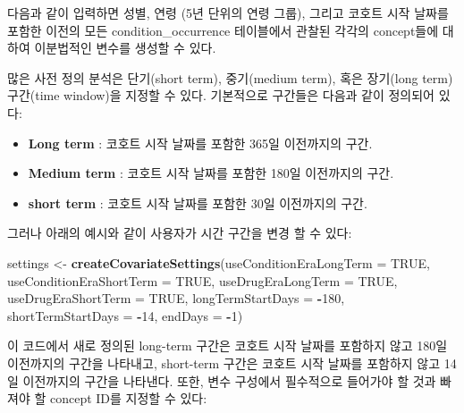 \documentclass[11pt]{book}
\newenvironment{Shaded}{\begin{snugshade}}{\end{snugshade}}
\newcommand{\KeywordTok}[1]{\textcolor[rgb]{0.13,0.29,0.53}{\textbf{#1}}}
\newcommand{\DataTypeTok}[1]{\textcolor[rgb]{0.13,0.29,0.53}{#1}}
\newcommand{\DecValTok}[1]{\textcolor[rgb]{0.00,0.00,0.81}{#1}}
\newcommand{\StringTok}[1]{\textcolor[rgb]{0.31,0.60,0.02}{#1}}
\newcommand{\OtherTok}[1]{\textcolor[rgb]{0.56,0.35,0.01}{#1}}
\newcommand{\OperatorTok}[1]{\textcolor[rgb]{0.81,0.36,0.00}{\textbf{#1}}}
\newcommand{\NormalTok}[1]{#1}
\providecommand{\tightlist}{%
  \setlength{\itemsep}{0pt}\setlength{\parskip}{0pt}}
\theoremstyle{definition}
\theoremstyle{definition}
\theoremstyle{definition}
\theoremstyle{remark}
\begin{document}
다음과 같이 입력하면 성별, 연령 (5년 단위의 연령 그룹), 그리고 코호트
시작 날짜를 포함한 이전의 모든 condition\_occurrence 테이블에서 관찰된
각각의 concept들에 대하여 이분법적인 변수를 생성할 수 있다.

많은 사전 정의 분석은 단기(short term), 중기(medium term), 혹은
장기(long term) 구간(time window)을 지정할 수 있다. 기본적으로 구간들은
다음과 같이 정의되어 있다:

\begin{itemize}
\tightlist
\item
  \textbf{Long term} : 코호트 시작 날짜를 포함한 365일 이전까지의 구간.
\item
  \textbf{Medium term} : 코호트 시작 날짜를 포함한 180일 이전까지의
  구간.
\item
  \textbf{short term} : 코호트 시작 날짜를 포함한 30일 이전까지의 구간.
\end{itemize}

그러나 아래의 예시와 같이 사용자가 시간 구간을 변경 할 수 있다:

\begin{Shaded}
\begin{Highlighting}[]
\NormalTok{settings <-}\StringTok{ }\KeywordTok{createCovariateSettings}\NormalTok{(}\DataTypeTok{useConditionEraLongTerm =} \OtherTok{TRUE}\NormalTok{, }
                                    \DataTypeTok{useConditionEraShortTerm =} \OtherTok{TRUE}\NormalTok{, }
                                    \DataTypeTok{useDrugEraLongTerm =} \OtherTok{TRUE}\NormalTok{,}
                                    \DataTypeTok{useDrugEraShortTerm =} \OtherTok{TRUE}\NormalTok{, }
                                    \DataTypeTok{longTermStartDays =} \OperatorTok{-}\DecValTok{180}\NormalTok{, }
                                    \DataTypeTok{shortTermStartDays =} \OperatorTok{-}\DecValTok{14}\NormalTok{, }
                                    \DataTypeTok{endDays =} \OperatorTok{-}\DecValTok{1}\NormalTok{) }
\end{Highlighting}
\end{Shaded}

이 코드에서 새로 정의된 long-term 구간은 코호트 시작 날짜를 포함하지
않고 180일 이전까지의 구간을 나타내고, short-term 구간은 코호트 시작
날짜를 포함하지 않고 14일 이전까지의 구간을 나타낸다. 또한, 변수
구성에서 필수적으로 들어가야 할 것과 빠져야 할 concept ID를 지정할 수
있다:
\end{document}

